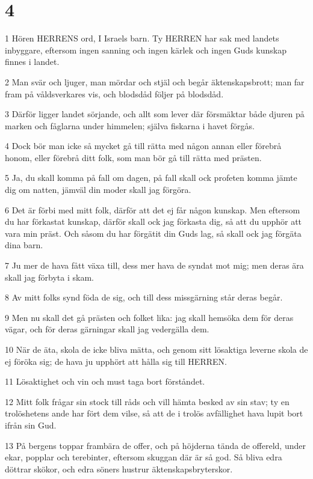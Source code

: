 \chapter{4}

\par 1 Hören HERRENS ord, I Israels barn. Ty HERREN har sak med landets inbyggare, eftersom ingen sanning och ingen kärlek och ingen Guds kunskap finnes i landet.
\par 2 Man svär och ljuger, man mördar och stjäl och begår äktenskapsbrott; man far fram på våldsverkares vis, och blodsdåd följer på blodsdåd.
\par 3 Därför ligger landet sörjande, och allt som lever där försmäktar både djuren på marken och fåglarna under himmelen; själva fiskarna i havet förgås.
\par 4 Dock bör man icke så mycket gå till rätta med någon annan eller förebrå honom, eller förebrå ditt folk, som man bör gå till rätta med prästen.
\par 5 Ja, du skall komma på fall om dagen, på fall skall ock profeten komma jämte dig om natten, jämväl din moder skall jag förgöra.
\par 6 Det är förbi med mitt folk, därför att det ej får någon kunskap. Men eftersom du har förkastat kunskap, därför skall ock jag förkasta dig, så att du upphör att vara min präst. Och såsom du har förgätit din Guds lag, så skall ock jag förgäta dina barn.
\par 7 Ju mer de hava fått växa till, dess mer hava de syndat mot mig; men deras ära skall jag förbyta i skam.
\par 8 Av mitt folks synd föda de sig, och till dess missgärning står deras begår.
\par 9 Men nu skall det gå prästen och folket lika: jag skall hemsöka dem för deras vägar, och för deras gärningar skall jag vedergälla dem.
\par 10 När de äta, skola de icke bliva mätta, och genom sitt lösaktiga leverne skola de ej föröka sig; de hava ju upphört att hålla sig till HERREN.
\par 11 Lösaktighet och vin och must taga bort förståndet.
\par 12 Mitt folk frågar sin stock till råds och vill hämta besked av sin stav; ty en trolöshetens ande har fört dem vilse, så att de i trolös avfällighet hava lupit bort ifrån sin Gud.
\par 13 På bergens toppar frambära de offer, och på höjderna tända de offereld, under ekar, popplar och terebinter, eftersom skuggan där är så god. Så bliva edra döttrar skökor, och edra söners hustrur äktenskapsbryterskor.

